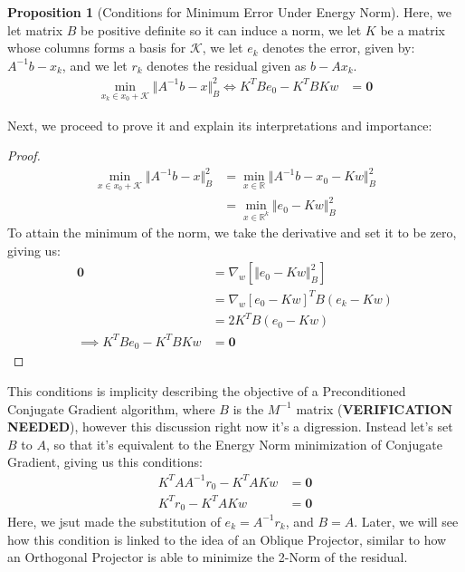 \documentclass[]{article}
\theoremstyle{definition}
\newtheorem{prop}{Proposition}[section]  %
\begin{document}
            \begin{prop}[Conditions for Minimum Error Under Energy Norm]
                Here, we let matrix $B$ be positive definite so it can induce a norm, we let $K$ be a matrix whose columns forms a basis for $\mathcal K$, we let $e_k$ denotes the error, given by: $A^{-1}b - x_k$, and we let $r_k$ denotes the residual given as $b - Ax_k$. 
                \begin{align}
                    \min_{x_k\in x_0 + \mathcal K}\Vert A^{-1}b - x\Vert_B^2
                    \iff
                    K^TBe_0 - K^TBKw &= \mathbf 0
                \end{align} 
            \end{prop}
            Next, we proceed to prove it and explain its interpretations and importance: 
            \begin{proof}
                \begin{align}
                    \min_{x \in x_0 + \mathcal K}
                    \Vert A^{-1}b - x\Vert_B^2
                    &= 
                    \min_{x\in \mathbb R} 
                    \Vert A^{-1}b - x_0 - Kw\Vert_B^2
                    \\
                    &= \min_{x\in \mathbb R^k}
                    \Vert e_0 - Kw\Vert_B^2
                \end{align}
                To attain the minimum of the norm, we take the derivative and set it to be zero, giving us: 
                \begin{align}
                    \mathbf 0 &= \nabla_w[\Vert e_0 - Kw\Vert_B^2]
                    \\
                    &= \nabla_w[e_0 - Kw]^TB(e_k - Kw)
                    \\
                    &= 2K^TB(e_0 - Kw)
                    \\
                    \implies 
                    K^TBe_0 - K^TBKw &= \mathbf 0
                \end{align}
            \end{proof}
            This conditions is implicity describing the objective of a Preconditioned Conjugate Gradient algorithm, where $B$ is the $M^{-1}$ matrix (\textbf{VERIFICATION NEEDED}), however this discussion right now it's a digression. Instead let's set $B$ to $A$, so that it's equivalent to the Energy Norm minimization of Conjugate Gradient, giving us this conditions: 
            \begin{align}
                K^TAA^{-1}r_0 - K^TAKw &= \mathbf 0
                \\
                K^Tr_0 - K^TAKw &= \mathbf 0
            \end{align}
            Here, we jsut made the substitution of $e_k = A^{-1}r_k$, and $B = A$. Later, we will see how this condition is linked to the idea of an Oblique Projector, similar to how an Orthogonal Projector is able to minimize the 2-Norm of the residual. 
\end{document}
